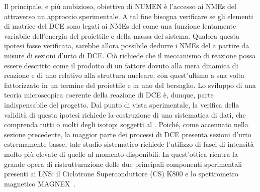 Il principale, e più ambizioso, obiettivo di NUMEN è l'accesso ai NMEs del \doppiobeta{} attraverso un approccio sperimentale. A tal fine bisogna verificare se gli elementi di matrice del DCE sono legati ai NMEs del \doppiobeta{} come una funzione lentamente variabile dell'energia del proiettile e della massa del sistema.
Qualora questa ipotesi fosse verificata, sarebbe allora possibile dedurre i NMEs del \doppiobeta{} a partire da misure di sezioni d'urto di DCE.
Ciò richiede che il meccanismo di reazione possa essere descritto come il prodotto di un fattore dovuto alla mera dinamica di reazione e di uno relativo alla struttura nucleare, con quest'ultimo a sua volta fattorizzato in un termine del proiettile e in uno del bersaglio.
Lo sviluppo di una teoria microscopica coerente della reazione di DCE è, dunque, parte indispensabile del progetto. 
Dal punto di vista sperimentale, la verifica della validità di questa ipotesi richiede la costruzione di una sistematica di dati, che comprenda tutti o molti degli isotopi soggetti al \doppiobeta.
Poiché, come accennato nella sezione precedente, la maggior parte dei processi di DCE presenta sezioni d'urto estremamente basse, tale studio sistematico richiede l'utilizzo di fasci di intensità molto più elevate di quelle al momento disponibili.
In quest'ottica rientra la grande opera di ristrutturazione delle due principali componenti sperimentali presenti ai LNS: il Ciclotrone Superconduttore (CS) K800 e lo spettrometro magnetico MAGNEX~\cite{cappuzzello:epja16}.

